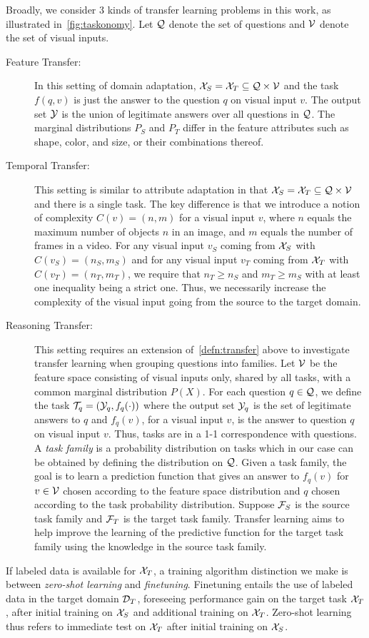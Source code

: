 Broadly, we consider 3 kinds of transfer learning problems in this work, as illustrated in~\cref{fig:taskonomy}. 
Let $\mathcal{Q}$ denote the set of questions and $\mathcal{V}$ denote the set of visual inputs.
\begin{description}
	\item[Feature Transfer:] In this setting of domain adaptation, $\mathcal{X}_S = \mathcal{X}_T \subseteq \mathcal{Q} \times \mathcal{V}$
	and the task $f(q,v)$ is just the answer to the question $q$ on visual input $v$. The output set $\mathcal{Y}$ is the union of legitimate answers
	over all questions in $\mathcal{Q}$.
	The marginal distributions $P_S$ and $P_T$ differ in the feature attributes such as shape, color, and size, or their combinations
	thereof.
	
	\item[Temporal Transfer:] This setting is similar to attribute adaptation in that $\mathcal{X}_S = \mathcal{X}_T \subseteq \mathcal{Q} \times \mathcal{V}$
	and there is a single task.
	The key difference is that we introduce a notion of complexity $C(v) = (n, m)$ for a visual input $v$,
	where $n$ equals the maximum number of objects $n$ in an image, and $m$
	equals  the number of frames in a video. 
	For any visual input $v_S$ coming from $\mathcal{X}_S$ with $C(v_S) = (n_S, m_S)$
	and for any visual input $v_T$ coming from $\mathcal{X}_T$ with $C(v_T) = (n_T, m_T)$, we require that $n_T \ge n_S$ and 
	$m_T \ge m_S$ with at least one inequality being a strict one. 
	Thus, we necessarily increase the complexity of the visual input going from the source to the target domain.
	
	\item[Reasoning Transfer:]
	This setting requires an extension of~\cref{defn:transfer} above to investigate transfer learning when
	grouping questions into families. Let $\mathcal{V}$ be the feature space consisting of visual inputs only, shared by
	all tasks, with a common marginal distribution $P(X)$. For each question $q \in \mathcal{Q}$, we define the task 
	$\mathcal{T}_q = (\mathcal{Y}_q, f_q(\cdot))$ where
	the output set $\mathcal{Y}_q$ is the set of legitimate answers to $q$ and $f_q(v)$, for a visual input $v$, 
	is the answer to question $q$ on visual input $v$.
	Thus, tasks are in a 1-1 correspondence with questions.
	A \emph{task family} is a probability distribution on tasks which in our case can be obtained by defining the distribution on $\mathcal{Q}$. 
	Given a task family, the goal is to learn a prediction function that gives an answer to $f_q(v)$ for $v \in \mathcal{V}$ chosen according 
	to the feature space distribution and $q$ chosen according to the task probability distribution.
	Suppose $\mathcal{F}_S$ is the source task family and $\mathcal{F}_T$ is the target task family.
	Transfer learning aims to help improve the learning of the predictive function for the target task family 
	using the knowledge in the source task family.
	
\end{description}

If labeled data is available for $\mathcal{X}_T$, a training algorithm distinction we make is between \emph{zero-shot learning} and \emph{finetuning}. Finetuning entails the use of labeled data in the target domain $\mathcal{D}_T$, foreseeing performance gain on the target task $\mathcal{X}_T$, after initial training on $\mathcal{X}_S$ and additional training on $\mathcal{X}_T$. Zero-shot learning thus refers to immediate test on $\mathcal{X}_T$ after initial training on $\mathcal{X}_S$.